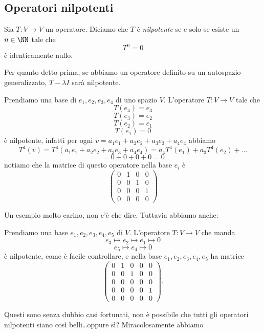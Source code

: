 \documentclass[11pt]{scrartcl}
\begin{document}
   	 \subsection{Operatori nilpotenti}
   	 \begin{definition}
   	 	Sia $T:V\to V$ un operatore. Diciamo che $T$ è \textit{nilpotente} se e solo se esiste un $n\in \NN$ tale che 
   	 	$$T^n=0$$
   	 	è identicamente nullo.
   	 \end{definition}
   	 Per quanto detto prima, se abbiamo un operatore definito su un autospazio generalizzato, $T-\lambda I $ sarà nilpotente.
   	 \begin{example}
   	 	Prendiamo una base di $e_1,e_2,e_3,e_4$ di uno spazio $V$. L'operatore $T:V\to V$ tale che 
   	 	$$T(e_4)=e_3$$
   	 	$$T(e_3)=e_2$$
   	 	$$T(e_2)=e_1$$
   	 	$$T(e_1)=0$$
   	 	è nilpotente, infatti per ogni $v=a_1e_1+a_2e_2+a_3e_3+a_4e_4$ abbiamo 
   	 	$$T^4(v)=T^4(a_1e_1+a_2e_2+a_3e_3+a_4e_4)=a_4T^4(e_1)+a_3T^4(e_2)+\dots$$
   	 	$$=0+0+0+0=0$$
   	 	notiamo che la matrice di questo operatore nella base $e_i$ è
   	 	$$
   	 	\begin{pmatrix}
   	 		0 & 1 & 0 & 0 \\
   	 		0 & 0 & 1 & 0 \\
   	 		0 & 0 & 0 & 1 \\
   	 		0 & 0 & 0 & 0 
   	 	\end{pmatrix}
   	 	$$ 
   	 \end{example}
   	 Un esempio molto carino, non c'è che dire. Tuttavia abbiamo anche:
   	 \begin{example} 
   	 	Prendiamo una base $e_1,e_2,e_3,e_4,e_5$ di $V$. L'operatore $T:V\to V$ che manda
   	 	$$e_3\mapsto e_2 \mapsto e_1 \mapsto 0$$
   	 	$$e_5 \mapsto e_4 \mapsto 0$$
   	 	è nilpotente, come è facile controllare, e nella base $e_1,e_2,e_3,e_4,e_5$ ha matrice
   	 	$$
   	 	\begin{pmatrix}
   	 		0 & 1 & 0 & 0 & 0 \\
			0 & 0 & 1 & 0 & 0\\
			0 & 0 & 0 & 0 & 0\\
			0 & 0 & 0 & 0 & 1\\
			0 & 0 & 0 & 0 & 0
   	 	\end{pmatrix}.
   	 	$$
   	 \end{example}
   	 Questi sono senza dubbio casi fortunati, non è possibile che tutti gli operatori nilpotenti siano così belli\dots oppure sì? Miracolosamente abbiamo
\end{document}
